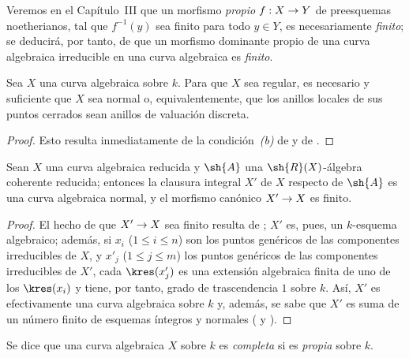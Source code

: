\documentclass[oneside,10pt]{amsart}
\makeatletter
\renewcommand{\leq}{\leqslant}
\newcommand{\ega@arrow}[2]{\mathchoice{#1}{#2}{#2}{#2}}
\renewcommand{\to}{\ega@arrow{\longrightarrow}{\rightarrow}}
\let\EGAOriginalLabel\label
\renewcommand{\label}[1]{\phantomsection\EGAOriginalLabel{#1}}
\makeatother
\begin{document}
Veremos en el Capítulo~III que un morfismo \emph{propio} $f:X\to Y$ de preesquemas noetherianos, tal que $f^{-1}(y)$ sea finito para todo $y\in Y$, es necesariamente \emph{finito};
se deducirá, por tanto, de  que un morfismo dominante propio de una curva algebraica irreducible en una curva algebraica es \emph{finito}.

\begin{corollary}[7.4.5]
\label{II.7.4.5}
Sea $X$ una curva algebraica sobre $k$.
Para que $X$ sea regular, es necesario y suficiente que $X$ sea normal o, equivalentemente, que los anillos locales de sus puntos cerrados sean anillos de valuación discreta.
\end{corollary}

\begin{proof}
Esto resulta inmediatamente de la condición~\emph{(b)} de  y de .
\end{proof}

\begin{corollary}[7.4.6]
\label{II.7.4.6}
Sean $X$ una curva algebraica reducida y $\sh{A}$ una $\sh{R}(X)$-álgebra coherente reducida;
entonces la clausura integral $X'$ de $X$ respecto de $\sh{A}$ \textup{} es una curva algebraica normal, y el morfismo canónico $X'\to X$ es finito.
\end{corollary}

\begin{proof}
El hecho de que $X'\to X$ sea finito resulta de ;
$X'$ es, pues, un $k$-esquema algebraico;
además, si $x_i$ ($1\leq i\leq n$) son los puntos genéricos de las componentes irreducibles de $X$, y $x'_j$ ($1\leq j\leq m$) los puntos genéricos de las componentes irreducibles de $X'$, cada $\kres(x'_j)$ es una extensión algebraica finita de uno de los $\kres(x_i)$  y tiene, por tanto, grado de trascendencia $1$ sobre $k$.
Así, $X'$ es efectivamente una curva algebraica sobre $k$ y, además, se sabe que $X'$ es suma de un número finito de esquemas íntegros y normales ( y ).
\end{proof}

\begin{env}[7.4.7]
\label{II.7.4.7}
Se dice que una curva algebraica $X$ sobre $k$ es \emph{completa} si es \emph{propia} sobre $k$.
\end{env}
\end{document}
